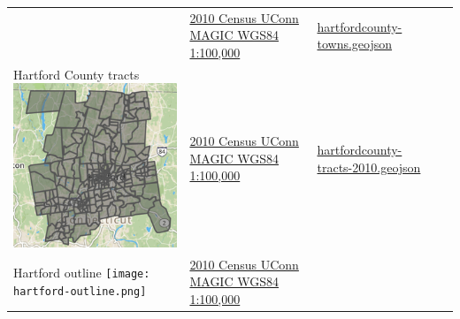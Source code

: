 \documentclass[
  english,
]{book}
\begin{document}
\begin{longtable}[]{@{}llll@{}}
\begin{minipage}[t]{0.28\columnwidth}
\end{minipage} & \begin{minipage}[t]{0.22\columnwidth}\raggedright
\href{http://magic.lib.uconn.edu/connecticut_data.html\#boundaries}{2010 Census UConn MAGIC WGS84 1:100,000}\strut
\end{minipage} & \begin{minipage}[t]{0.19\columnwidth}\raggedright
\href{data/hartfordcounty-towns.geojson}{hartfordcounty-towns.geojson}\strut
\end{minipage} & \begin{minipage}[t]{0.19\columnwidth}\raggedright
\strut
\end{minipage}\tabularnewline
\begin{minipage}[t]{0.28\columnwidth}\raggedright
Hartford County tracts \includegraphics{data/hartfordcounty-tracts-2010.png}\strut
\end{minipage} & \begin{minipage}[t]{0.22\columnwidth}\raggedright
\href{http://magic.lib.uconn.edu/connecticut_data.html\#boundaries}{2010 Census UConn MAGIC WGS84 1:100,000}\strut
\end{minipage} & \begin{minipage}[t]{0.19\columnwidth}\raggedright
\href{data/hartfordcounty-tracts-2010.geojson}{hartfordcounty-tracts-2010.geojson}\strut
\end{minipage} & \begin{minipage}[t]{0.19\columnwidth}\raggedright
\strut
\end{minipage}\tabularnewline
\begin{minipage}[t]{0.28\columnwidth}\raggedright
Hartford outline \texttt{[image: hartford-outline.png]}\strut
\end{minipage} & \begin{minipage}[t]{0.22\columnwidth}\raggedright
\href{http://magic.lib.uconn.edu/connecticut_data.html\#boundaries}{2010 Census UConn MAGIC WGS84 1:100,000}\strut

\end{minipage}
\end{longtable}
\end{document}
